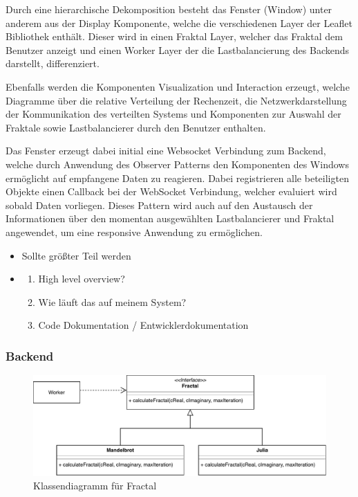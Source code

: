 Durch eine hierarchische Dekomposition besteht das Fenster (Window) unter anderem aus der Display Komponente, welche die verschiedenen Layer der Leaflet Bibliothek enthält. Dieser wird in einen Fraktal Layer, welcher das Fraktal dem Benutzer anzeigt und einen Worker Layer der die Lastbalancierung des Backends darstellt, differenziert. 

Ebenfalls werden die Komponenten Visualization und Interaction erzeugt, welche Diagramme über die relative Verteilung der Rechenzeit, die Netzwerkdarstellung der Kommunikation des verteilten Systems und Komponenten zur Auswahl der Fraktale sowie Lastbalancierer durch den Benutzer enthalten. 

Das Fenster erzeugt dabei initial eine Websocket Verbindung zum Backend, welche durch Anwendung des Observer Patterns den Komponenten des Windows ermöglicht auf empfangene Daten zu reagieren. Dabei registrieren alle beteiligten Objekte einen Callback bei der WebSocket Verbindung, welcher evaluiert wird sobald Daten vorliegen. Dieses Pattern wird auch auf den Austausch der Informationen über den momentan ausgewählten Lastbalancierer und Fraktal angewendet, um eine responsive Anwendung zu ermöglichen.

\begin{itemize}
	\item Sollte größter Teil werden
	\item \begin{enumerate}
		      \item High level overview?
		      \item Wie läuft das auf meinem System?
		      \item Code Dokumentation / Entwicklerdokumentation
	      \end{enumerate}
\end{itemize}

\subsubsection{Backend}

\begin{figure}
    \centering
        \includegraphics[width=0.8\linewidth]{img/Implementierung/Fractals.pdf}
        \caption{Klassendiagramm für Fractal}
    \label{fig:klassendiagramm_fractal}
\end{figure}